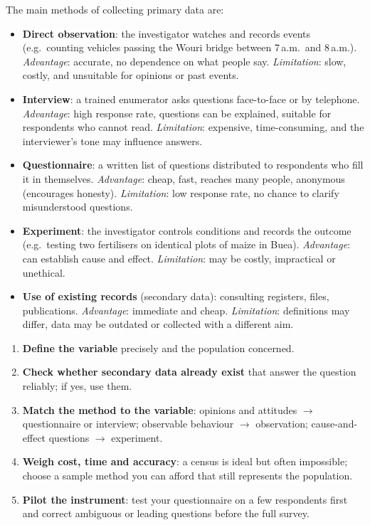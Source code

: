 \documentclass[11pt]{article}
\begin{document}
The main methods of collecting primary data are:

\begin{itemize}
\item \textbf{Direct observation}: the investigator watches and records events (e.g.\ counting vehicles passing the Wouri bridge between 7\,a.m.\ and 8\,a.m.). \emph{Advantage}: accurate, no dependence on what people say. \emph{Limitation}: slow, costly, and unsuitable for opinions or past events.
\item \textbf{Interview}: a trained enumerator asks questions face-to-face or by telephone. \emph{Advantage}: high response rate, questions can be explained, suitable for respondents who cannot read. \emph{Limitation}: expensive, time-consuming, and the interviewer's tone may influence answers.
\item \textbf{Questionnaire}: a written list of questions distributed to respondents who fill it in themselves. \emph{Advantage}: cheap, fast, reaches many people, anonymous (encourages honesty). \emph{Limitation}: low response rate, no chance to clarify misunderstood questions.
\item \textbf{Experiment}: the investigator controls conditions and records the outcome (e.g.\ testing two fertilisers on identical plots of maize in Buea). \emph{Advantage}: can establish cause and effect. \emph{Limitation}: may be costly, impractical or unethical.
\item \textbf{Use of existing records} (secondary data): consulting registers, files, publications. \emph{Advantage}: immediate and cheap. \emph{Limitation}: definitions may differ, data may be outdated or collected with a different aim.
\end{itemize}

\begin{methode}
\begin{enumerate}
\item \textbf{Define the variable} precisely and the population concerned.
\item \textbf{Check whether secondary data already exist} that answer the question reliably; if yes, use them.
\item \textbf{Match the method to the variable}: opinions and attitudes $\to$ questionnaire or interview; observable behaviour $\to$ observation; cause-and-effect questions $\to$ experiment.
\item \textbf{Weigh cost, time and accuracy}: a census is ideal but often impossible; choose a sample method you can afford that still represents the population.
\item \textbf{Pilot the instrument}: test your questionnaire on a few respondents first and correct ambiguous or leading questions before the full survey.
\end{enumerate}
\end{methode}
\end{document}
